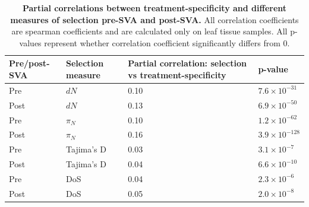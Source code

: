 \documentclass[12pt]{article}
\begin{document}
\begin{table}[H]
 \centering
 \begin{tabularx}{\textwidth}{|L|L|L|L|}
\hline
{\bf Pre/post-SVA} & {\bf Selection measure} & {\bf Partial correlation: selection vs treatment-specificity} & {\bf p-value}\\
\hline
Pre & $dN$ & 0.10 & $7.6\times10^{-31}$ \\
Post & $dN$ & 0.13 & $6.9\times10^{-50}$ \\
\hline
Pre & $\pi_N$ & 0.10 & $1.2\times10^{-62}$ \\
Post & $\pi_N$ & 0.16 & $3.9\times10^{-128}$ \\
\hline
Pre & Tajima's D & 0.03 & $3.1\times10^{-7}$ \\
Post & Tajima's D & 0.04 & $6.6\times10^{-10}$ \\
\hline
Pre & DoS & 0.04 & $2.3\times10^{-6}$ \\
Post & DoS & 0.05 & $2.0\times10^{-8}$ \\
\hline
\end{tabularx}
\caption{\textbf{Partial correlations between treatment-specificity and different measures of selection pre-SVA and post-SVA.} All correlation coefficients are spearman coefficients and are calculated only on leaf tissue samples. All p-values represent whether correlation coefficient significantly differs from 0.}
\end{table}
\end{document}

